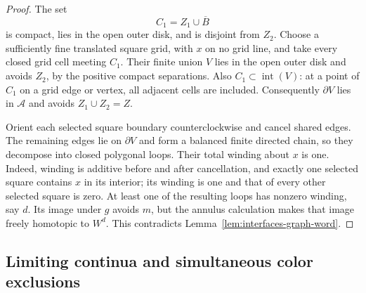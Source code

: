 \begin{proof}
The set
\[
 C_1=Z_1\cup\overline B
\]
is compact, lies in the open outer disk, and is disjoint from $Z_2$.
Choose a sufficiently fine translated square grid, with $x$ on no
grid line, and take every closed grid cell meeting $C_1$.  Their
finite union $V$ lies in the open outer disk and avoids $Z_2$, by the
positive compact separations.  Also $C_1\subset\operatorname{int}(V)$:
at a point of $C_1$ on a grid edge or vertex, all adjacent cells
are included.  Consequently $\partial V$ lies in $\mathcal A$
and avoids $Z_1\cup Z_2=Z$.

Orient each selected square boundary counterclockwise and cancel
shared edges.  The remaining edges lie on $\partial V$ and form
a balanced finite directed chain, so they decompose into closed
polygonal loops.  Their total winding about $x$ is one.  Indeed,
winding is additive before and after cancellation, and exactly one
selected square contains $x$ in its interior; its winding is one
and that of every other selected square is zero.  At least one
of the resulting loops has nonzero winding, say $d$.  Its image
under $g$ avoids $m$, but the annulus calculation makes that image
freely homotopic to $W^d$.  This contradicts
Lemma~\ref{lem:interfaces-graph-word}.
\end{proof}

\subsection{Limiting continua and simultaneous color exclusions}

